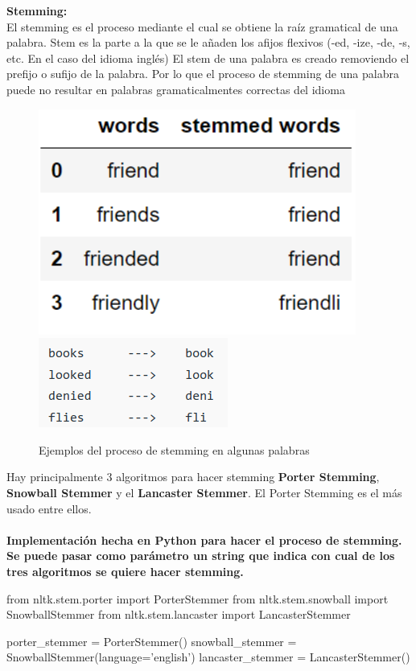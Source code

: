 \documentclass{llncs}
\begin{document}
\noindent
\textbf{Stemming:}\\ 
\noindent
El stemming es el proceso mediante el cual se obtiene la raíz gramatical de una palabra. 
Stem es la parte a la que se le añaden los afijos flexivos (-ed, -ize, -de, -s, etc. En el caso del idioma inglés)
El stem de una palabra es creado removiendo el prefijo o sufijo de la palabra. Por lo que el proceso
de stemming de una palabra puede no resultar en palabras gramaticalmentes correctas del idioma

\begin{figure}
    
    \includegraphics[scale = .3]{./images/stemming1png.png}
    \includegraphics[scale = .7]{./images/stemming2png.png}
    \caption{Ejemplos del proceso de stemming en algunas palabras}
\end{figure}

Hay principalmente 3 algoritmos para hacer stemming \textbf{Porter Stemming}, 
\textbf{ Snowball Stemmer} y el \textbf{Lancaster Stemmer}. El Porter Stemming 
es el más usado entre ellos.
\\\\
\textbf{Implementación hecha en Python para hacer el proceso de stemming. Se puede pasar como parámetro un string que indica con cual de los tres algoritmos se quiere hacer stemming.}

\begin{python}
    from nltk.stem.porter import PorterStemmer
    from nltk.stem.snowball import SnowballStemmer
    from nltk.stem.lancaster import LancasterStemmer

    porter_stemmer =  PorterStemmer()
    snowball_stemmer = SnowballStemmer(language='english')
    lancaster_stemmer = LancasterStemmer()
\end{python}
\end{document}
